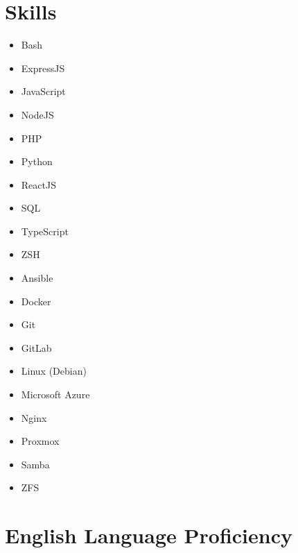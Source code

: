 \documentclass[12pt,letterpaper,sans]{moderncv}
\begin{document}
\section{Skills}
\begin{cvcolumns}
  {
    \begin{itemize}
      \item Bash
      \item ExpressJS
      \item JavaScript
      \item NodeJS
      \item PHP
      \item Python
      \item ReactJS
      \item SQL
      \item TypeScript
      \item ZSH
    \end{itemize}
  }
  {
    \begin{itemize}
      \item Ansible
      \item Docker
      \item Git
      \item GitLab
      \item Linux (Debian)
      \item Microsoft Azure
      \item Nginx
      \item Proxmox
      \item Samba
      \item ZFS
    \end{itemize}
  }
\end{cvcolumns}

\section{English Language Proficiency}
\end{document}
